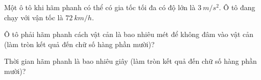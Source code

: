 \begin{vidu}%
Một ô tô khi hãm phanh có thể có gia tốc tối đa có độ lớn là $3\ m/s^2$. Ô tô đang chạy với vận tốc là $72\ km/h$. 
\begin{vdc}
Ô tô phải hãm phanh cách vật cản là bao nhiêu mét để không đâm vào vật cản (làm tròn kết quả đến chữ số hàng phần mười)?  
\end{vdc}
\begin{vdc}
Thời gian hãm phanh là bao nhiêu giây (làm tròn kết quả đến chữ số hàng phần mười)?
\end{vdc}
\end{vidu}

